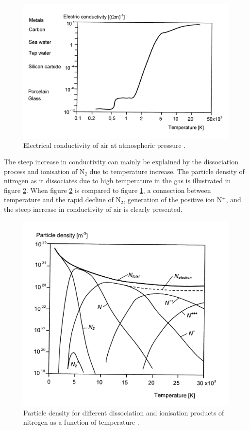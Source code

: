 \documentclass[10pt,a4paper,twoside]{article}
\begin{document}
\begin{figure}[H]
\centering
\includegraphics[scale=0.8]{Bilder/Theory/airConduct.png}
\caption{Electrical conductivity of air at atmospheric pressure \cite{bib:HVEbreak}.} \label{fig:condAir}
\end{figure}

The steep increase in conductivity can mainly be explained by the dissociation process and ionisation of N$_2$ due to temperature increase. The particle density of nitrogen as it dissociates due to high temperature in the gas is illustrated in figure \ref{fig:Ndensi}. When figure \ref{fig:Ndensi} is compared to figure \ref{fig:condAir}, a connection between temperature and the rapid decline of N$_2$, generation of the positive ion N$^+$, and the steep increase in conductivity of air is clearly presented.

\begin{figure}[H]
\centering
\includegraphics[scale=0.8]{Bilder/Theory/particleDensNit.png}
\caption{Particle density for different dissociation and ionisation products of nitrogen as a function of temperature \cite{bib:HVEbreak}.} \label{fig:Ndensi}
\end{figure}
\end{document}

